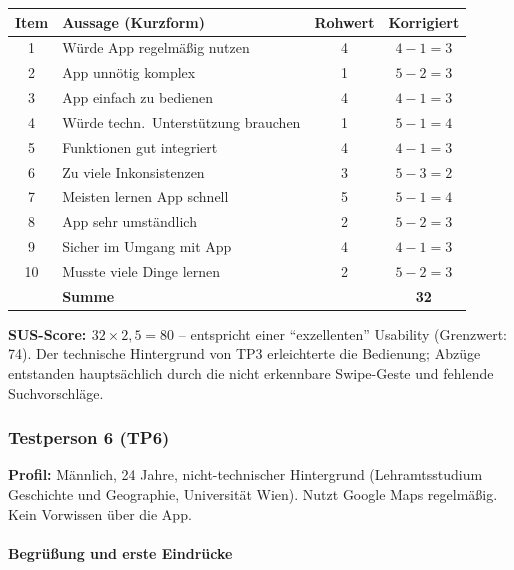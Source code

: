 \documentclass{article}
\begin{document}
\begin{tabular}{@{}clcc@{}}
  \hline
  \textbf{Item} & \textbf{Aussage (Kurzform)} & \textbf{Rohwert} & \textbf{Korrigiert} \\
  \hline
  1  & Würde App regelmäßig nutzen          & 4 & $4-1=3$ \\
  2  & App unnötig komplex                  & 1 & $5-2=3$ \\
  3  & App einfach zu bedienen              & 4 & $4-1=3$ \\
  4  & Würde techn.\ Unterstützung brauchen & 1 & $5-1=4$ \\
  5  & Funktionen gut integriert            & 4 & $4-1=3$ \\
  6  & Zu viele Inkonsistenzen              & 3 & $5-3=2$ \\
  7  & Meisten lernen App schnell           & 5 & $5-1=4$ \\
  8  & App sehr umständlich                 & 2 & $5-2=3$ \\
  9  & Sicher im Umgang mit App             & 4 & $4-1=3$ \\
  10 & Musste viele Dinge lernen            & 2 & $5-2=3$ \\
  \hline
     & \textbf{Summe}                       &   & \textbf{32} \\
  \hline
\end{tabular}

\medskip
\textbf{SUS-Score: $32 \times 2{,}5 = 80$} –
entspricht einer \enquote{exzellenten} Usability (Grenzwert: 74).
Der technische Hintergrund von TP3 erleichterte die Bedienung;
Abzüge entstanden hauptsächlich durch die nicht erkennbare
Swipe-Geste und fehlende Suchvorschläge.

\subsubsection*{Testperson 6 (TP6)}

\textbf{Profil:} Männlich, 24 Jahre, nicht-technischer Hintergrund
(Lehramtsstudium Geschichte und Geographie, Universität Wien).
Nutzt Google Maps regelmäßig.
Kein Vorwissen über die App.

\paragraph{Begrüßung und erste Eindrücke}
\end{document}
